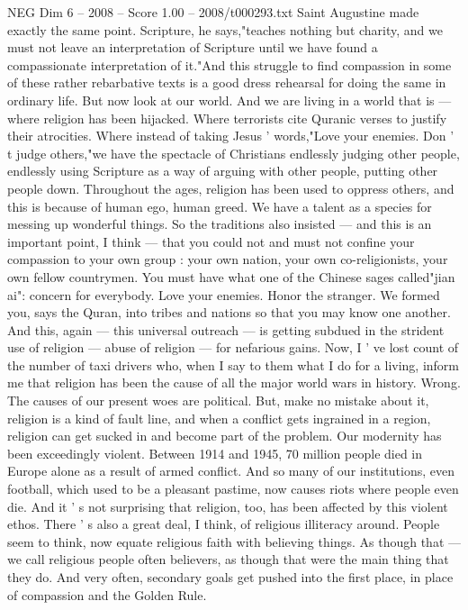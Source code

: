 \begin{textsample}{NEG Dim 6 – 2008 – Score 1.00 – 2008/t000293.txt}
Saint Augustine made exactly the same point.
Scripture, he says,"teaches nothing but charity, and we must not leave an interpretation of Scripture until we have found a compassionate interpretation of it."And this struggle to find compassion in some of these rather rebarbative texts is a good dress rehearsal for doing the same in ordinary life.
But now look at our world.
And we are living in a world that is — where religion has been hijacked.
Where terrorists cite Quranic verses to justify their atrocities.
Where instead of taking Jesus ' words,"Love your enemies.
Don ' t judge others,"we have the spectacle of Christians endlessly judging other people, endlessly using Scripture as a way of arguing with other people, putting other people down.
Throughout the ages, religion has been used to oppress others, and this is because of human ego, human greed.
We have a talent as a species for messing up wonderful things.
So the traditions also insisted — and this is an important point, I think — that you could not and must not confine your compassion to your own group : your own nation, your own co-religionists, your own fellow countrymen.
You must have what one of the Chinese sages called"jian ai": concern for everybody.
Love your enemies.
Honor the stranger.
We formed you, says the Quran, into tribes and nations so that you may know one another.
And this, again — this universal outreach — is getting subdued in the strident use of religion — abuse of religion — for nefarious gains.
Now, I ' ve lost count of the number of taxi drivers who, when I say to them what I do for a living, inform me that religion has been the cause of all the major world wars in history.
Wrong.
The causes of our present woes are political.
But, make no mistake about it, religion is a kind of fault line, and when a conflict gets ingrained in a region, religion can get sucked in and become part of the problem.
Our modernity has been exceedingly violent.
Between 1914 and 1945, 70 million people died in Europe alone as a result of armed conflict.
And so many of our institutions, even football, which used to be a pleasant pastime, now causes riots where people even die.
And it ' s not surprising that religion, too, has been affected by this violent ethos.
There ' s also a great deal, I think, of religious illiteracy around.
People seem to think, now equate religious faith with believing things.
As though that — we call religious people often believers, as though that were the main thing that they do.
And very often, secondary goals get pushed into the first place, in place of compassion and the Golden Rule.

\end{textsample}
